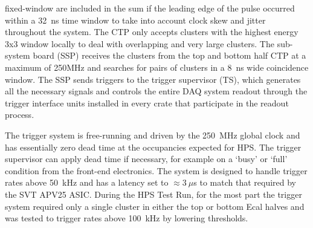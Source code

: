 \documentclass[final,3p,times,twocolumn]{elsarticle}
\begin{document}
fixed-window are included in the sum if the leading edge of the pulse occurred within a 32~ns time 
window to take into account clock skew and jitter throughout the system.
The CTP only accepts clusters with the highest energy 3x3 window locally to deal with overlapping and 
very large clusters. The sub-system board (SSP) receives the clusters from the top and bottom half CTP 
at a maximum of 250MHz and searches for pairs of clusters in a 8~ns wide coincidence window. The 
SSP sends triggers to the trigger supervisor (TS), which generates all the necessary signals and 
controls the entire DAQ system readout through the trigger interface units installed in every crate that 
participate in the readout process.

The trigger system is free-running and driven by the 250~MHz global clock and has essentially zero 
dead time at the occupancies expected for HPS. The trigger supervisor can apply dead time if 
necessary, for example on a `busy' or `full' condition from the front-end electronics. The system is 
designed to handle trigger rates above 50~kHz and has a latency set to $\approx 3~\mu$s to match 
that required by the SVT APV25 ASIC. During the HPS Test Run, for the most part the trigger system 
required only a single cluster in either the top or bottom Ecal halves and was tested to trigger rates 
above 100~kHz by lowering thresholds. 
\end{document}
